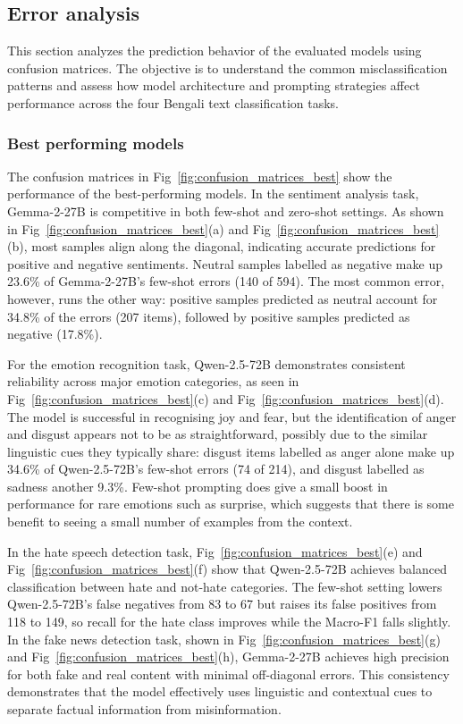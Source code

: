 \documentclass[10pt,letterpaper]{article}
\begin{document}
\subsection*{Error analysis}

This section analyzes the prediction behavior of the evaluated models using confusion matrices. The objective is to understand the common misclassification patterns and assess how model architecture and prompting strategies affect performance across the four Bengali text classification tasks.

\subsubsection*{Best performing models}
\label{sec:best_performing_models}

The confusion matrices in Fig~\ref{fig:confusion_matrices_best} show the performance of the best-performing models. In the sentiment analysis task, Gemma-2-27B is competitive in both few-shot and zero-shot settings. As shown in Fig~\ref{fig:confusion_matrices_best}(a) and Fig~\ref{fig:confusion_matrices_best}(b), most samples align along the diagonal, indicating accurate predictions for positive and negative sentiments. Neutral samples labelled as negative make up 23.6\% of Gemma-2-27B's few-shot errors (140 of 594). The most common error, however, runs the other way: positive samples predicted as neutral account for 34.8\% of the errors (207 items), followed by positive samples predicted as negative (17.8\%).

For the emotion recognition task, Qwen-2.5-72B demonstrates consistent reliability across major emotion categories, as seen in Fig~\ref{fig:confusion_matrices_best}(c) and Fig~\ref{fig:confusion_matrices_best}(d). The model is successful in recognising joy and fear, but the identification of anger and disgust appears not to be as straightforward, possibly due to the similar linguistic cues they typically share: disgust items labelled as anger alone make up 34.6\% of Qwen-2.5-72B's few-shot errors (74 of 214), and disgust labelled as sadness another 9.3\%. Few-shot prompting does give a small boost in performance for rare emotions such as surprise, which suggests that there is some benefit to seeing a small number of examples from the context.

In the hate speech detection task, Fig~\ref{fig:confusion_matrices_best}(e) and Fig~\ref{fig:confusion_matrices_best}(f) show that Qwen-2.5-72B achieves balanced classification between hate and not-hate categories. The few-shot setting lowers Qwen-2.5-72B's false negatives from 83 to 67 but raises its false positives from 118 to 149, so recall for the hate class improves while the Macro-F1 falls slightly. In the fake news detection task, shown in Fig~\ref{fig:confusion_matrices_best}(g) and Fig~\ref{fig:confusion_matrices_best}(h), Gemma-2-27B achieves high precision for both fake and real content with minimal off-diagonal errors. This consistency demonstrates that the model effectively uses linguistic and contextual cues to separate factual information from misinformation.
\end{document}
